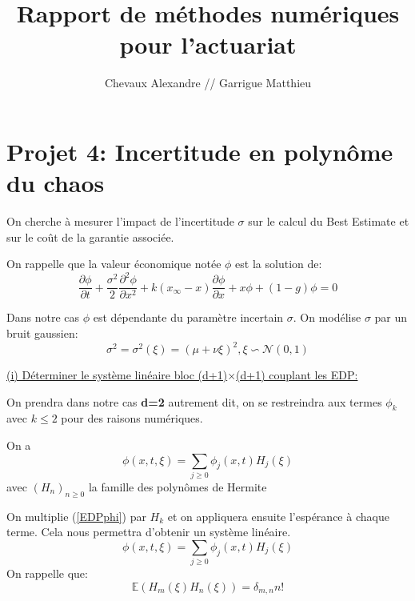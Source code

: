 \documentclass[a4paper,oneside,11pt]{article}
\title{Rapport de méthodes numériques pour l'actuariat}
\author{Chevaux Alexandre // Garrigue Matthieu}
\date{}
\newcommand{\E}{\ensuremath{\mathbb{E}}}
\newcommand{\dr}{\ensuremath{\partial}}
\begin{document}
\maketitle


\part*{Projet 4: Incertitude en polynôme du chaos}
%

\qquad On cherche à mesurer l'impact de l'incertitude $\sigma$ sur le calcul du Best Estimate et sur le coût de la garantie associée.

On rappelle que la valeur économique notée $\phi$ est la solution de:
\begin{equation}
\label{EDPphi}
\frac{\dr \phi}{\dr t}+\frac{\sigma^2}{2}\frac{\dr^2 \phi}{\dr x^2}+k(x_{\infty}-x)\frac{\dr \phi}{\dr x}+x\phi +(1-g)\phi=0
\end{equation} 

Dans notre cas $\phi$ est dépendante du paramètre incertain $\sigma$.
On modélise $\sigma$ par un bruit gaussien:
\begin{equation}
\sigma^2=\sigma^{2}(\xi)=(\mu +\nu\xi)^{2}, \xi \backsim \mathcal{N}(0,1)
\end{equation}

\underline{(i) Déterminer le système linéaire bloc (d+1)$\times$(d+1) couplant les EDP:}

On prendra dans notre cas \textbf{d=2} autrement dit, on se restreindra aux termes $\phi_k$ avec $k \leq 2$ pour des raisons numériques.

On a 
\begin{equation}
\label{exprphi}
\phi(x,t,\xi)=\sum_{j\ge 0}\phi_{j}(x,t)H_{j}(\xi)
\end{equation}
avec $(H_{n})_{n\ge0}$ la famille des polynômes de Hermite

On multiplie (\ref{EDPphi}) par $H_k$ et on appliquera ensuite l'espérance à chaque terme. Cela nous permettra d'obtenir un système linéaire.
\begin{equation}
\phi(x,t,\xi)=\sum_{j\ge 0}\phi_{j}(x,t)H_{j}(\xi)
\end{equation}
On rappelle que: 
\begin{equation}
\label{espHmHn}
\E(H_m(\xi)H_n(\xi)) = \delta_{m,n}n!
\end{equation}
\end{document}
